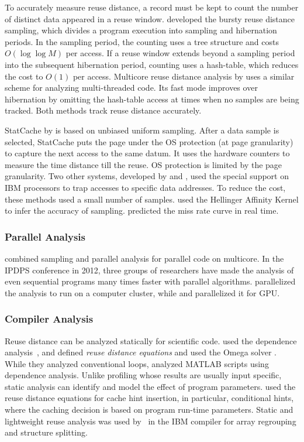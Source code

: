 To accurately measure reuse distance, a record must be kept to count
the number of distinct data appeared in a reuse window. \citet{ZhongC:ISMM08} developed the bursty reuse distance sampling, which divides a
program execution into sampling and hibernation
periods.  In the sampling period, the counting
uses a tree structure and costs $O(\log\log M)$ per access.  If a
reuse window extends beyond a sampling period into the subsequent
hibernation period, counting uses a hash-table, which reduces the cost
to $O(1)$ per access.  Multicore reuse distance analysis by
\citet{Schuff+:PACT10} uses a similar scheme
for analyzing multi-threaded code.  Its fast
mode improves over hibernation by omitting the hash-table access at
times when no samples are being tracked.  Both methods track
reuse distance accurately.

StatCache by \citet{BergH:SIGMETRICS05} is based on unbiased uniform
sampling.  After a data sample is selected,
StatCache puts the page under the OS protection (at page granularity)
to capture the next access to the same datum.  It uses the hardware
counters to measure the time distance till the reuse.  OS protection
is limited by the page granularity.  Two other systems, developed by
\citet{Cascaval+:PACT05} and \citet{Tam+:ASPLOS09}, used the special support on IBM processors
to trap accesses to specific data addresses.  To reduce the cost,
these methods used a small number of samples.
\citet{Cascaval+:PACT05} used
the Hellinger Affinity Kernel to infer the accuracy of
sampling.  \citet{Tam+:ASPLOS09} predicted the miss rate
curve in real time. 

\subsubsection{Parallel Analysis}
\citet{Schuff+:PACT10} combined sampling and parallel analysis for
parallel code on multicore.  In the IPDPS conference in 2012, three
groups of researchers have made the analysis of even sequential
programs many times faster with parallel algorithms.
\citet{Niu+:IPDPS12} parallelized the analysis to run on a computer
cluster, while \citet{Cui+:IPDPS12} and \citet{Gupta+:IPDPS12}
parallelized it for GPU.

\subsubsection{Compiler Analysis}
Reuse distance can be analyzed statically for scientific code.
\citet{CascavalP:ICS03} used the dependence
analysis~\citep{AllenK:Book01}, and \citet{BeylsD:JSA05} defined
\emph{reuse distance equations} and used the Omega
solver \citep{PughW:PLDI92}.  While they analyzed conventional loops,
\citet{ChauhanS:ICS10} analyzed MATLAB scripts using dependence
analysis.  Unlike profiling whose results are usually input specific,
static analysis can identify and model the effect of program
parameters.  \citet{BeylsD:JSA05} used the reuse distance equations
for cache hint insertion, in particular, conditional hints, where the
caching decision is based on program run-time parameters.  Static and
lightweight reuse analysis was used by~\citet{Shen+:ICS05} in the IBM
compiler for array regrouping and structure splitting.

